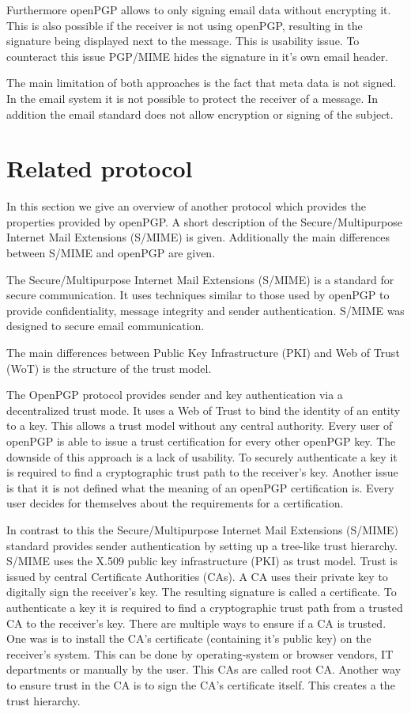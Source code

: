 Furthermore openPGP allows to only signing email data without encrypting it. This is also possible if the receiver is not using openPGP, resulting in the signature being displayed next to the message. This is usability issue. To counteract this issue PGP/MIME hides the signature in it's own email header.


The main limitation of both approaches is the fact that meta data is not signed. In the email system it is not possible to protect the receiver of a message. In addition the email standard does not allow encryption or signing of the subject.

\section{Related protocol} \label{section:openpgp:smime}

In this section we give an overview of another protocol which provides the properties provided by openPGP. A short description of the Secure/Multipurpose Internet Mail Extensions (S/MIME) is given. Additionally the main differences between S/MIME and openPGP are given.

The Secure/Multipurpose Internet Mail Extensions (S/MIME) is a standard for secure communication. It uses techniques similar to those used by openPGP to provide confidentiality, message integrity and sender authentication. S/MIME was designed to secure email communication. 

The main differences between Public Key Infrastructure (PKI) and Web of Trust (WoT) is the structure of the trust model. 

The OpenPGP protocol provides sender and key authentication via a decentralized trust mode. It uses a Web of Trust to bind the identity of an entity to a key. This allows a trust model without any central authority. Every user of openPGP is able to issue a trust certification for every other openPGP key. The downside of this approach is a lack of usability. To securely authenticate a key it is required to find a cryptographic trust path to the receiver's key. Another issue is that it is not defined what the meaning of an openPGP certification is. Every user decides for themselves about the requirements for a certification.

In contrast to this the Secure/Multipurpose Internet Mail Extensions (S/MIME) standard provides sender authentication by setting up a tree-like trust hierarchy. S/MIME uses the X.509 public key infrastructure (PKI) as trust model. Trust is issued by central Certificate Authorities (CAs). A CA uses their private key to digitally sign the receiver's key. The resulting signature is called a certificate. To authenticate a key it is required to find a cryptographic trust path from a trusted CA to the receiver's key. There are multiple ways to ensure if a CA is trusted. One was is to install the CA's certificate (containing it's public key) on the receiver's system. This can be done by operating-system or browser vendors, IT departments or manually by the user. This CAs are called root CA. Another way to ensure trust in the CA is to sign the CA's certificate itself. This creates a the trust hierarchy. 

